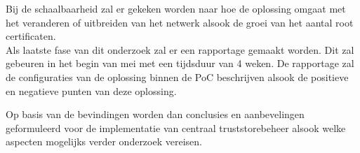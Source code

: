 Bij de schaalbaarheid zal er gekeken worden naar hoe de oplossing omgaat met het veranderen of uitbreiden van het netwerk alsook de groei van het aantal root certificaten. \\


Als laatste fase van dit onderzoek zal er een rapportage gemaakt worden. Dit zal gebeuren in het begin van mei met een tijdsduur van 4 weken. De rapportage zal de configuraties van de oplossing binnen de PoC beschrijven alsook de positieve en negatieve punten van deze oplossing.

Op basis van de bevindingen worden dan conclusies en aanbevelingen geformuleerd voor de implementatie van centraal truststorebeheer alsook welke aspecten mogelijks verder onderzoek vereisen.


